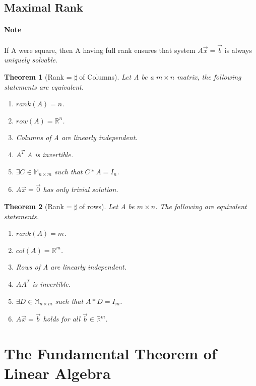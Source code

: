 \documentclass[11pt]{article}
\newtheorem{theorem}{Theorem}
\newcommand{\re}[1]{\mathbb{R}^#1}
\newcommand{\ma}[2]{\mathbb{M}_{#1 \times #2}}
\begin{document}
	\subsection{Maximal Rank}
	\paragraph{Note} If A were square, then A having full rank ensures that system $A\vec{x} = \vec{b}$ is always \emph{uniquely solvable}.
	\begin{theorem}[Rank = $\sharp$ of Columns]
		Let A be a $m \times n$ matrix, the following statements are equivalent.
		\begin{enumerate}
			\item $rank(A) = n$.
			\item $row(A) = \re{n}$.
			\item Columns of A are linearly independent.
			\item $A^{T}$ A is invertible.
			\item $\exists C \in \ma{n}{m}$ such that $C*A = I_n$.
			\item $A\vec{x} = \vec{0}$ has only trivial solution.
		\end{enumerate}
	\end{theorem}
	\begin{theorem}[Rank = $\sharp$ of rows]
		Let A be $m \times n$. The following are equivalent statements.
		\begin{enumerate}
			\item $rank(A) = m$.
			\item $col(A) = \re{m}$.
			\item Rows of A are linearly independent.
			\item $A A^{T}$ is invertible.
			\item $\exists D \in \ma{n}{m}$ such that $A*D = I_m$.
			\item $A\vec{x} = \vec{b}$ holds for all $\vec{b} \in \re{m}$.
		\end{enumerate}
	\end{theorem}
	\section{The Fundamental Theorem of Linear Algebra}
\end{document}
